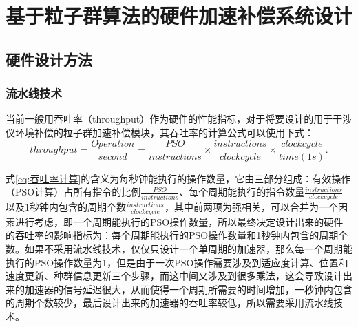\chapter{基于粒子群算法的硬件加速补偿系统设计}
\section{硬件设计方法}
\subsection{流水线技术}
\label{流水线技术}
当前一般用吞吐率（throughput）作为硬件的性能指标，对于将要设计的用于干涉仪环境补偿的粒子群加速补偿模块，其吞吐率的计算公式可以使用下式：
\begin{equation}\label{eq:吞吐率计算}
    throughput = \frac{Operation}{second}=\frac{PSO}{instructions}\times \frac{instructions}{clock cycle} \times \frac{clock cycle}{time(1s)}.
    \end{equation}

式\eqref{eq:吞吐率计算}的含义为每秒钟能执行的操作数量，它由三部分组成：有效操作（PSO计算）占所有指令的比例$\frac{PSO}{instructions}$、每个周期能执行的指令数量$\frac{instructions}{clock cycle}$以及1秒钟内包含的周期个数$\frac{instructions}{clock cycle}$，其中前两项为强相关，可以合并为一个因素进行考虑，即一个周期能执行的PSO操作数量，所以最终决定设计出来的硬件的吞吐率的影响指标为：每个周期能执行的PSO操作数量和1秒钟内包含的周期个数。如果不采用流水线技术，仅仅只设计一个单周期的加速器，那么每一个周期能执行的PSO操作数量为1，但是由于一次PSO操作需要涉及到适应度计算、位置和速度更新、种群信息更新三个步骤，而这中间又涉及到很多乘法，这会导致设计出来的加速器的信号延迟很大，从而使得一个周期所需要的时间增加，一秒钟内包含的周期个数较少，最后设计出来的加速器的吞吐率较低，所以需要采用流水线技术\cite{李景琳2021基于,吴艳霞2019深度学习}。

